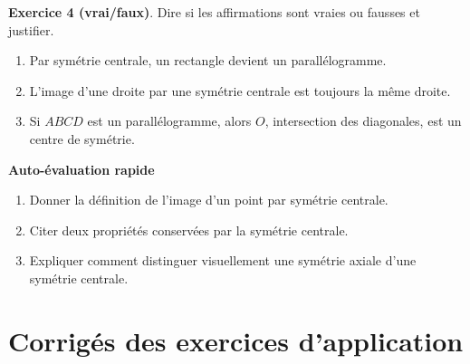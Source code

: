 \begin{exercisebox}
\textbf{Exercice 4 (vrai/faux)}. Dire si les affirmations sont vraies ou fausses et justifier.
\begin{enumerate}
  \item Par sym\'etrie centrale, un rectangle devient un parall\'elogramme.
  \item L'image d'une droite par une sym\'etrie centrale est toujours la même droite.
  \item Si $ABCD$ est un parall\'elogramme, alors $O$, intersection des diagonales, est un centre de sym\'etrie.
\end{enumerate}
\end{exercisebox}

\begin{quizbox}
\textbf{Auto-\'evaluation rapide}
\begin{enumerate}[label=\arabic*)]
  \item Donner la d\'efinition de l'image d'un point par sym\'etrie centrale.
  \item Citer deux propri\'et\'es conserv\'ees par la sym\'etrie centrale.
  \item Expliquer comment distinguer visuellement une symétrie axiale d'une symétrie centrale.
\end{enumerate}
\end{quizbox}

\clearpage
\section*{Corrigés des exercices d'application}

